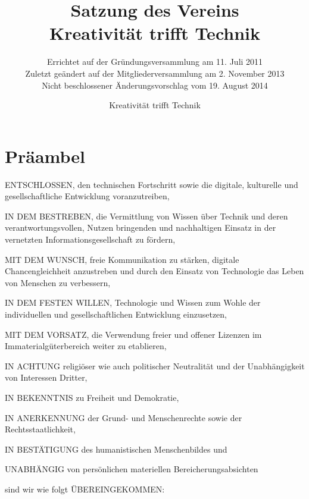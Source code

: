 \documentclass[a4paper,10pt]{scrreprt}
\begin{document}
\title{Satzung des Vereins\\Kreativität trifft Technik}
\subtitle{
	Errichtet auf der Gründungsversammlung am 11. Juli 2011\\
	Zuletzt geändert auf der Mitgliederversammlung am 2. November 2013\\
	Nicht beschlossener Änderungsvorschlag vom 19. August 2014
}
\author{Kreativität trifft Technik}



\section*{Präambel}

ENTSCHLOSSEN, den technischen Fortschritt sowie die digitale, kulturelle und
gesellschaftliche Entwicklung voranzutreiben,

IN DEM BESTREBEN, die Vermittlung von Wissen über Technik und deren
verantwortungsvollen, Nutzen bringenden und nachhaltigen Einsatz in der
vernetzten Informationsgesellschaft zu fördern,

MIT DEM WUNSCH, freie Kommunikation zu stärken, digitale Chancengleichheit
anzustreben und durch den Einsatz von Technologie das Leben von Menschen zu
verbessern,

IN DEM FESTEN WILLEN, Technologie und Wissen zum Wohle der individuellen und
gesellschaftlichen Entwicklung einzusetzen,

MIT DEM VORSATZ, die Verwendung freier und offener Lizenzen im
Immaterialgüterbereich weiter zu etablieren,

IN ACHTUNG religiöser wie auch politischer Neutralität und der Unabhängigkeit
von Interessen Dritter,

IN BEKENNTNIS zu Freiheit und Demokratie,

IN ANERKENNUNG der Grund- und Menschenrechte sowie der Rechtsstaatlichkeit,

IN BESTÄTIGUNG des humanistischen Menschenbildes und

UNABHÄNGIG von persönlichen materiellen Bereicherungsabsichten

sind wir wie folgt ÜBEREINGEKOMMEN:

\newpage
\end{document}
